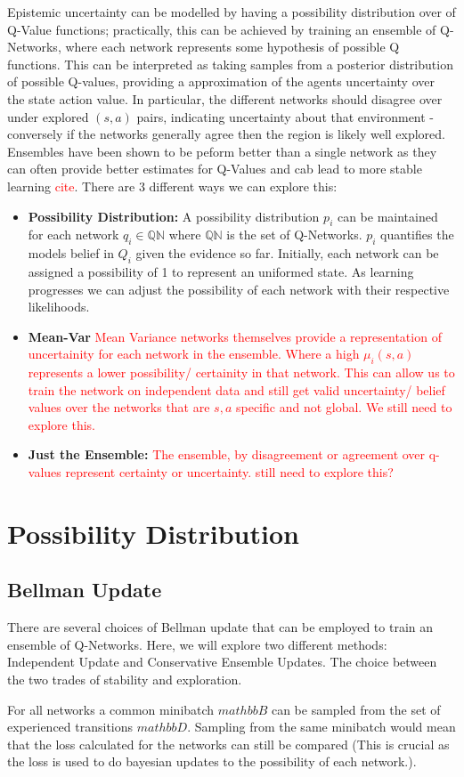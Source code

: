 \documentclass[12pt,a4paper]{report}
\newcommand\myworries[1]{\textcolor{red}{#1}}
\begin{document}
Epistemic uncertainty can be modelled by having a possibility distribution over of Q-Value functions; practically, this can be achieved by training an ensemble of Q-Networks, where each network represents some hypothesis of possible Q functions. This can be interpreted as taking samples from a posterior distribution of possible Q-values, providing a approximation of the agents uncertainty over the state action value. In particular, the different networks should disagree over under explored $(s,a)$ pairs, indicating uncertainty about that environment - conversely if the networks generally agree then the region is likely well explored. Ensembles have been shown to be peform better than a single network as they can often provide better estimates for Q-Values and cab lead to more stable learning \myworries{cite}. There are 3 different ways we can explore this:
\begin{itemize}
  \item \textbf{Possibility Distribution:} A possibility distribution $p_i$ can be maintained for each network $q_i \in \mathbb{QN}$ where $\mathbb{QN}$  is the set of Q-Networks. $p_i$ quantifies the models belief in $Q_i$ given the evidence so far. Initially, each network can be assigned a possibility of 1 to represent an uniformed state. As learning progresses we can adjust the possibility of each network with their respective likelihoods.  
  \item \textbf{Mean-Var} \myworries{Mean Variance networks themselves provide a representation of uncertainity for each network in the ensemble. Where a high $\mu_i(s,a)$ represents a lower possibility/ certainity in that network. This can allow us to train the network on independent data and still get valid uncertainty/ belief values over the networks that are $s,a$ specific and not global. We still need to explore this.} 
  \item \textbf{Just the Ensemble:} \myworries{The ensemble, by disagreement or agreement over q-values represent certainty or uncertainty. still need to explore this?}
\end{itemize}

\section{Possibility Distribution}
\subsection{Bellman Update}
There are several choices of Bellman update that can be employed to train an ensemble of Q-Networks. Here, we will explore two different methods: Independent Update and Conservative Ensemble Updates. The choice between the two trades of stability and exploration. \par
%
For all networks a common minibatch $mathbb{B}$ can be sampled from the set of experienced transitions $mathbb{D}$. Sampling from the same minibatch would mean that the loss calculated for the networks can still be compared (This is crucial as the loss is used to do bayesian updates to the possibility of each network.).
\end{document}

